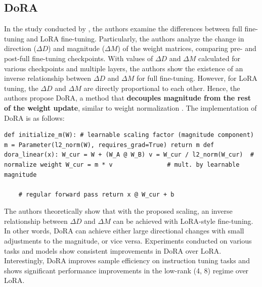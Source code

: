 \subsection{DoRA}
In the study conducted by \citet{liu2024dora}, the authors examine the differences between full fine-tuning and LoRA fine-tuning. Particularly, the authors analyze the change in direction ($\Delta D$) and magnitude ($\Delta M$) of the weight matrices, comparing pre- and post-full fine-tuning checkpoints. With values of $\Delta D$ and $\Delta M$ calculated for various checkpoints and multiple layers, the authors show the existence of an inverse relationship between $\Delta D$ and $\Delta M$ for full fine-tuning. However, for LoRA tuning, the $\Delta D$ and $\Delta M$ are directly proportional to each other. Hence, the authors propose DoRA, a method that \textbf{decouples magnitude from the rest of the weight update}, similar to weight normalization \citep{weight_normalization}. The implementation of DoRA is as follows:

\begin{lstlisting}
def initialize_m(W): # learnable scaling factor (magnitude component) m = Parameter(l2_norm(W), requires_grad=True) return m def dora_linear(x): W_cur = W + (W_A @ W_B) v = W_cur / l2_norm(W_cur)  # normalize weight W_cur = m * v               # mult. by learnable magnitude

    # regular forward pass return x @ W_cur + b
\end{lstlisting}

The authors theoretically show that with the proposed scaling, an inverse relationship between $\Delta D$ and $\Delta M$ can be achieved with LoRA-style fine-tuning. In other words, DoRA can achieve either large directional changes with small adjustments to the magnitude, or vice versa. Experiments conducted on various tasks and models show consistent improvements in DoRA over LoRA. Interestingly, DoRA improves sample efficiency on instruction tuning tasks and shows significant performance improvements in the low-rank (4, 8) regime over LoRA.

